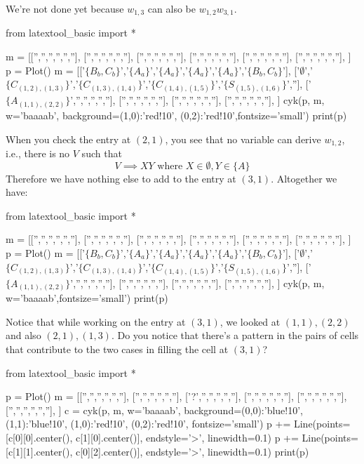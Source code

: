 We're not done yet because $w_{1,3}$ can also be $w_{1,2} w_{3,1}$.
\begin{python}
from latextool_basic import *

m = [['','','','','',''],
     ['','','','','',''],
     ['','','','','',''],
     ['','','','','',''],
     ['','','','','',''],
     ['','','','','',''],
     ]
p = Plot()
m = [['$\{B_b,C_b\}$','$\{A_a\}$','$\{A_a\}$','$\{A_a\}$','$\{A_a\}$','$\{B_b,C_b\}$'],
     ['$\emptyset$','$\{C_{(1,2),(1,3)}\}$','$\{C_{(1,3),(1,4)}\}$','$\{C_{(1,4),(1,5)}\}$','$\{S_{(1,5),(1,6)}\}$',''],
     ['$\{A_{(1,1),(2,2)}\}$','','','','',''],
     ['','','','','',''],
     ['','','','','',''],
     ['','','','','',''],
     ]
cyk(p, m, w='baaaab', background={(1,0):'red!10', (0,2):'red!10'},fontsize='small')
print(p)
\end{python}
When you check the entry at $(2,1)$, you see that no variable can derive $w_{1,2}$, i.e.,
there is no $V$ such that
\[
  V \implies XY \text{ where } X \in \emptyset, Y \in \{A\}
\]
Therefore we have nothing else to add to the entry at $(3,1)$.
Altogether we have:
\begin{python}
from latextool_basic import *

m = [['','','','','',''],
     ['','','','','',''],
     ['','','','','',''],
     ['','','','','',''],
     ['','','','','',''],
     ['','','','','',''],
     ]
p = Plot()
m = [['$\{B_b,C_b\}$','$\{A_a\}$','$\{A_a\}$','$\{A_a\}$','$\{A_a\}$','$\{B_b,C_b\}$'],
     ['$\emptyset$','$\{C_{(1,2),(1,3)}\}$','$\{C_{(1,3),(1,4)}\}$','$\{C_{(1,4),(1,5)}\}$','$\{S_{(1,5),(1,6)}\}$',''],
     ['$\{A_{(1,1),(2,2)}\}$','','','','',''],
     ['','','','','',''],
     ['','','','','',''],
     ['','','','','',''],
     ]
cyk(p, m, w='baaaab',fontsize='small')
print(p)
\end{python}

Notice that while working on the entry at $(3,1)$, we looked at 
$(1,1),(2,2)$ and also $(2,1),(1,3)$.
Do you notice that there's a pattern in the pairs of cells that
contribute to the two cases in filling the cell at $(3,1)$?
\begin{python}
from latextool_basic import *

p = Plot()
m = [['','','','','',''],
     ['','','','','',''],
     ['?','','','','',''],
     ['','','','','',''],
     ['','','','','',''],
     ['','','','','',''],
     ]
c = cyk(p, m, w='baaaab',
        background={(0,0):'blue!10', (1,1):'blue!10', (1,0):'red!10', (0,2):'red!10'},
        fontsize='small')
p += Line(points=[c[0][0].center(), c[1][0].center()], endstyle='>', linewidth=0.1)     
p += Line(points=[c[1][1].center(), c[0][2].center()], endstyle='>', linewidth=0.1)     
print(p)
\end{python}

